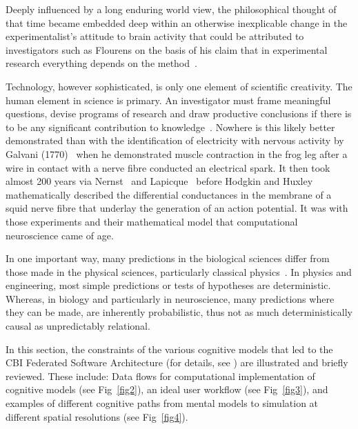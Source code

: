 \documentclass[10pt,letterpaper]{article}
\begin{document}
Deeply influenced by a long enduring world view, the philosophical thought of that time became embedded deep within an otherwise inexplicable change in the experimentalist's attitude to brain activity that could be attributed to investigators such as Flourens on the basis of his claim that in experimental research everything depends on the method~\cite{flourens24}.

Technology, however sophisticated, is only one element of scientific creativity. The human element in science is primary. An investigator must frame meaningful questions, devise programs of research and draw productive conclusions if there is to be any significant contribution to knowledge~\cite{clarke87}. Nowhere is this likely better demonstrated than with the identification of electricity with nervous activity by Galvani (1770)~\cite{galvani91} when he demonstrated muscle contraction in the frog leg after a wire in contact with a nerve fibre conducted an electrical spark. It then took almost 200 years via Nernst~\cite{nernst89} and Lapicque~\cite{lapicque07} before Hodgkin and Huxley~\cite{hodgkin52e} mathematically described the differential conductances in the membrane of a squid nerve fibre that underlay the generation of an action potential. It was with those experiments and their mathematical model that computational neuroscience came of age.

In one important way, many predictions in the biological sciences differ from those made in the physical sciences, particularly classical physics~\cite{darwin71}. In physics and engineering, most simple predictions or tests of hypotheses are deterministic. Whereas, in biology and particularly in neuroscience, many predictions where they can be made, are inherently probabilistic, thus not as much deterministically causal as unpredictably relational.

In this section, the constraints of the various cognitive models that led to the CBI Federated Software Architecture (for details, see \cite{cornelis12,cornelis08:_cbi_archit_comput_simul_realis}) are illustrated and briefly reviewed. These include: Data flows for computational implementation of cognitive models (see Fig~\ref{fig2}), an ideal user workflow (see Fig~\ref{fig3}), and examples of different cognitive paths from mental models to simulation at different spatial resolutions (see Fig~\ref{fig4}).
\end{document}
